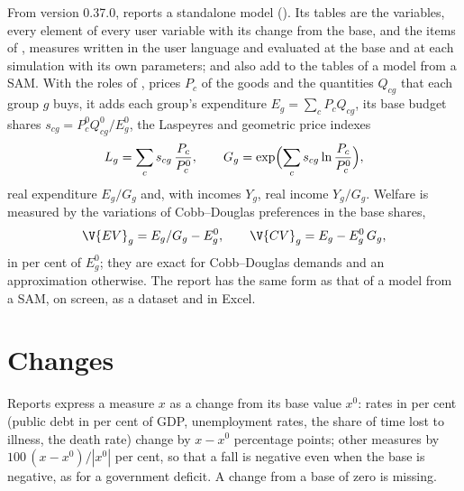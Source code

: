 From version 0.37.0,  reports a standalone model
(). Its tables are the variables, every element of
every user variable with its change from the base, and the items of
, measures written in the user language and evaluated at the
base and at each simulation with its own parameters;  and
 also add to the tables of a model from a SAM. With the roles
of , prices $P_c$ of the goods and the quantities
$Q_{cg}$ that each group $g$ buys, it adds each group's expenditure $E_g =
\sum_c P_c Q_{cg}$, its base budget shares $s_{cg} = P^0_c Q^0_{cg} /
E^0_g$, the Laspeyres and geometric price indexes
\begin{equation*}
L_g = \sum_c s_{cg}\,\frac{P_c}{P^0_c}, \qquad
G_g = \exp\Bigl(\sum_c s_{cg} \ln \frac{P_c}{P^0_c}\Bigr),
\end{equation*}
real expenditure $E_g/G_g$ and, with incomes $Y_g$, real income $Y_g/G_g$.
Welfare is measured by the variations of Cobb--Douglas preferences in the
base shares,
\begin{equation*}
\V{EV}_g = E_g/G_g - E^0_g, \qquad \V{CV}_g = E_g - E^0_g\,G_g,
\end{equation*}
in per cent of $E^0_g$; they are exact for Cobb--Douglas demands and an
approximation otherwise. The report has the same form as that of a model
from a SAM, on screen, as a dataset and in Excel.

\section{Changes}

Reports express a measure $x$ as a change from its base value $x^0$: rates in
per cent (public debt in per cent of GDP, unemployment rates, the share of
time lost to illness, the death rate) change by $x - x^0$ percentage points;
other measures by $100\,(x - x^0)/|x^0|$ per cent, so that a fall is negative
even when the base is negative, as for a government deficit. A change from a
base of zero is missing.
